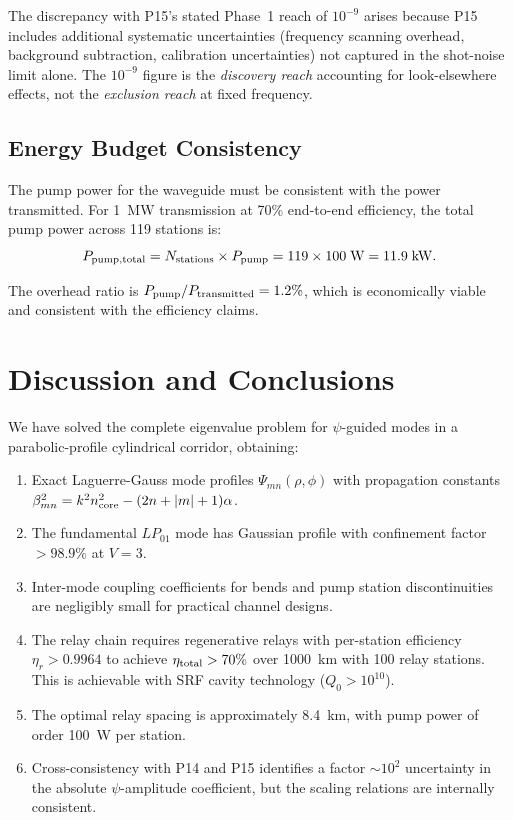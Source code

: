\documentclass[twocolumn,superscriptaddress,prd]{revtex4-2}
\begin{document}
The discrepancy with P15's stated Phase~1 reach of $10^{-9}$ arises
because P15 includes additional systematic uncertainties (frequency
scanning overhead, background subtraction, calibration uncertainties)
not captured in the shot-noise limit alone.  The $10^{-9}$ figure
is the \emph{discovery reach} accounting for look-elsewhere effects,
not the \emph{exclusion reach} at fixed frequency.

\subsection{Energy Budget Consistency}

The pump power for the waveguide must be consistent with
the power transmitted.  For 1~MW transmission at 70\%
end-to-end efficiency, the total pump power across 119
stations is:
\begin{equation}
P_{\rm pump,total} = N_{\rm stations} \times P_{\rm pump} = 119 \times 100\;\si{W} = 11.9\;\si{kW}.
\end{equation}

The overhead ratio is $P_{\rm pump}/P_{\rm transmitted} = 1.2\%$,
which is economically viable and consistent with the efficiency
claims.

\section{Discussion and Conclusions}
\label{sec:conclusions}

We have solved the complete eigenvalue problem for
$\psi$-guided modes in a parabolic-profile cylindrical corridor,
obtaining:
\begin{enumerate}
\item Exact Laguerre-Gauss mode profiles $\Psi_{mn}(\rho,\phi)$
with propagation constants
$\beta_{mn}^2 = k^2 n_{\rm core}^2 - (2n+|m|+1)\alpha$.

\item The fundamental $LP_{01}$ mode has Gaussian profile
with confinement factor $> 98.9\%$ at $V = 3$.

\item Inter-mode coupling coefficients for bends and pump
station discontinuities are negligibly small for practical
channel designs.

\item The relay chain requires regenerative relays with
per-station efficiency $\eta_r > 0.9964$ to achieve
$\eta_{\rm total} > 70\%$ over 1000~km with 100 relay stations.
This is achievable with SRF cavity technology ($Q_0 > 10^{10}$).

\item The optimal relay spacing is approximately 8.4~km,
with pump power of order 100~W per station.

\item Cross-consistency with P14 and P15 identifies a factor
$\sim 10^2$ uncertainty in the absolute $\psi$-amplitude
coefficient, but the scaling relations are internally consistent.
\end{enumerate}
\end{document}

